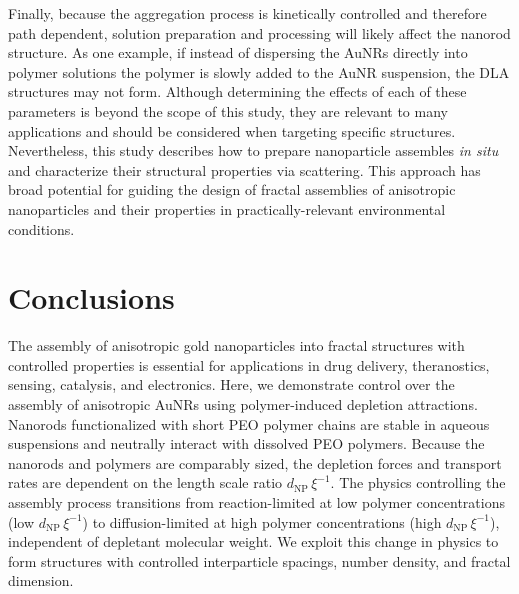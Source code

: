 \documentclass[journal=jacsat, superscriptaddress]{achemso}
\begin{document}
Finally, because the aggregation process is kinetically controlled and therefore path dependent, solution preparation and processing will likely affect the nanorod structure. As one example, if instead of dispersing the AuNRs directly into polymer solutions the polymer is slowly added to the AuNR suspension, the DLA structures may not form. Although determining the effects of each of these parameters is beyond the scope of this study, they are relevant to many applications and should be considered when targeting specific structures. Nevertheless, this study describes how to prepare nanoparticle assembles \emph{in situ} and characterize their structural properties via scattering. This approach has broad potential for guiding the design of fractal assemblies of anisotropic nanoparticles and their properties in practically-relevant environmental conditions.

\section{Conclusions}

The assembly of anisotropic gold nanoparticles into fractal structures with controlled properties is essential for applications in drug delivery, theranostics, sensing, catalysis, and electronics. Here, we demonstrate control over the assembly of anisotropic AuNRs using polymer-induced depletion attractions. Nanorods functionalized with short PEO polymer chains are stable in aqueous suspensions and neutrally interact with dissolved PEO polymers. Because the nanorods and polymers are comparably sized, the depletion forces and transport rates are dependent on the length scale ratio $d_\mathrm{NP} \, \xi^{-1}$. The physics controlling the assembly process transitions from reaction-limited at low polymer concentrations (low $d_\mathrm{NP} \, \xi^{-1}$)  to diffusion-limited at high polymer concentrations (high $d_\mathrm{NP} \, \xi^{-1}$), independent of depletant molecular weight. We exploit this change in physics to form structures with controlled interparticle spacings, number density, and fractal dimension. 
\end{document}
